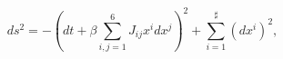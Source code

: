 \begin{equation}
\label{metn3M}
ds^2 = - \left( dt + \beta \sum_{i,j=1}^6 J_{ij} x^i dx^j \right)^2  
+ \sum_{i=1}^{\sharp} ( dx^i )^2, 
\end{equation}


